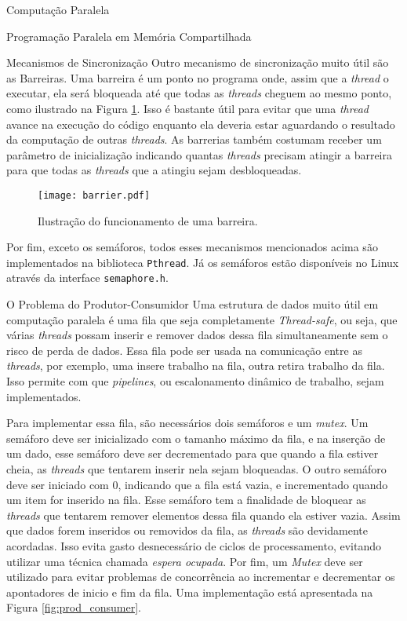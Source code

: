 \begin{section}{Computação Paralela}
\begin{subsection}{Programação Paralela em Memória Compartilhada}
\begin{subsubsection}{Mecanismos de Sincronização}
Outro mecanismo de sincronização muito útil são as Barreiras. Uma barreira
é um ponto no programa onde, assim que a \textit{thread} o executar, ela
será bloqueada até que todas as \textit{threads} cheguem ao mesmo ponto, como
ilustrado na Figura \ref{fig:barrier}.
Isso é bastante útil para evitar que uma \textit{thread} avance na execução
do código enquanto ela deveria estar aguardando o resultado da computação
de outras \textit{threads}. As barrerias também costumam receber um parâmetro
de inicialização indicando quantas \textit{threads} precisam atingir a
barreira para que todas as \textit{threads} que a atingiu sejam desbloqueadas.

\begin{figure}[ht]
 \centering
 \texttt{[image: barrier.pdf]}
 \caption{Ilustração do funcionamento de uma barreira.}
 \label{fig:barrier}
\end{figure}


Por fim, exceto os semáforos, todos esses mecanismos mencionados acima são
implementados na biblioteca \texttt{Pthread}. Já os semáforos estão disponíveis
no Linux através da interface \texttt{semaphore.h}.

\end{subsubsection}

\begin{subsubsection}{O Problema do Produtor-Consumidor}
    Uma estrutura de dados muito útil em computação paralela
é uma fila que seja completamente \textit{Thread-safe}, ou seja,
que várias \textit{threads} possam inserir e remover dados dessa
fila simultaneamente sem o risco de perda de dados. Essa fila
pode ser usada na comunicação entre as \textit{threads}, por
exemplo, uma insere trabalho na fila, outra retira trabalho da
fila. Isso permite com que \textit{pipelines}, ou escalonamento
dinâmico de trabalho, sejam implementados.

Para implementar essa fila, são necessários dois semáforos e um
\textit{mutex}. Um semáforo deve ser inicializado com o tamanho máximo
da fila, e na inserção de um dado, esse semáforo deve ser decrementado
para que quando a fila estiver cheia, as \textit{threads} que tentarem
inserir nela sejam bloqueadas. O outro semáforo deve ser iniciado com
0, indicando que a fila está vazia, e incrementado quando um item for
inserido na fila. Esse semáforo tem a finalidade de
bloquear as \textit{threads} que tentarem remover elementos dessa
fila quando ela estiver vazia. Assim que dados forem inseridos ou removidos
da fila, as \textit{threads} são devidamente acordadas. Isso evita gasto
desnecessário de ciclos de processamento, evitando utilizar uma técnica
chamada \textit{espera ocupada}. Por fim, um \textit{Mutex} deve ser
utilizado para evitar problemas de concorrência ao incrementar e
decrementar os apontadores de inicio e fim da fila. Uma implementação
está apresentada na Figura \ref{fig:prod_consumer}.


\end{subsubsection}
\end{subsection}
\end{section}
